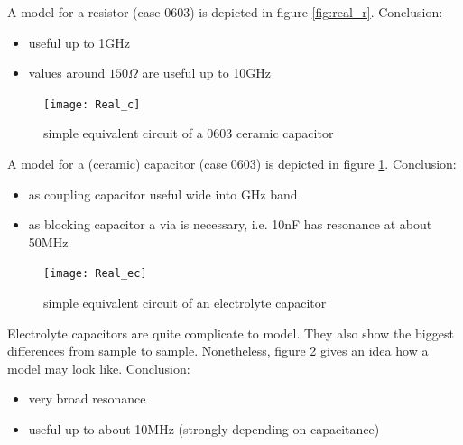 A model for a resistor (case 0603) is depicted in figure \ref{fig:real_r}.
Conclusion:
\begin{itemize}
\item useful up to 1GHz
\item values around $150\Omega$ are useful up to 10GHz
\end{itemize}

\addvspace{12pt}

\begin{figure}[ht]
\begin{center}
\texttt{[image: Real\_c]}
\end{center}
\caption{simple equivalent circuit of a 0603 ceramic capacitor}
\label{fig:real_c}
\end{figure}
\FloatBarrier

A model for a (ceramic) capacitor (case 0603) is depicted in figure
\ref{fig:real_c}. Conclusion:
\begin{itemize}
\item as coupling capacitor useful wide into GHz band
\item as blocking capacitor a via is necessary, i.e. 10nF has resonance
      at about 50MHz
\end{itemize}

\addvspace{12pt}

\begin{figure}[ht]
\begin{center}
\texttt{[image: Real\_ec]}
\end{center}
\caption{simple equivalent circuit of an electrolyte capacitor}
\label{fig:real_ec}
\end{figure}
\FloatBarrier

Electrolyte capacitors are quite complicate to model. They also show the
biggest differences from sample to sample. Nonetheless, figure
\ref{fig:real_ec} gives an idea how a model may look like. Conclusion:
\begin{itemize}
\item very broad resonance
\item useful up to about 10MHz (strongly depending on capacitance)
\end{itemize}

